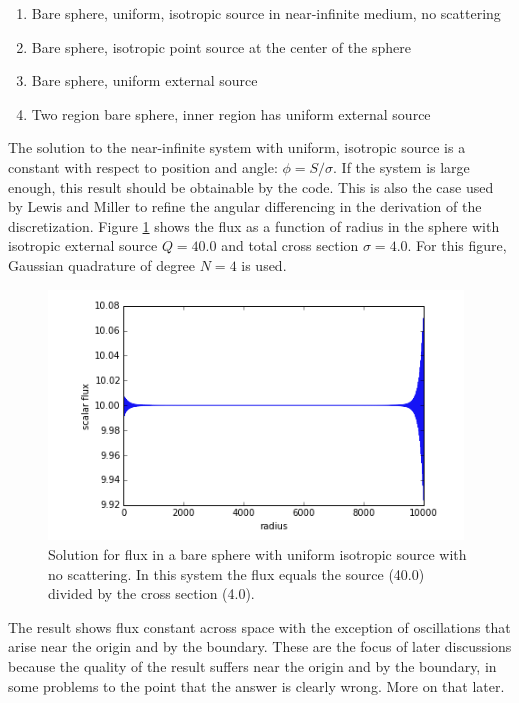 \documentclass[11pt, oneside]{article}   	%
\begin{document}
\begin{enumerate}
\item Bare sphere, uniform, isotropic source in near-infinite medium, no scattering
\item Bare sphere, isotropic point source at the center of the sphere
\item Bare sphere, uniform external source
\item Two region bare sphere, inner region has uniform external source 
\end{enumerate}

The solution to the near-infinite system with uniform, isotropic source is a constant with respect to position and angle: $\phi = S/\sigma$. If the system is large enough, this result should be obtainable by the code. This is also the case used by Lewis and Miller \cite{lm} to refine the angular differencing in the derivation of the discretization. Figure \ref{fig:near_inf_uniform} shows the flux as a function of radius in the sphere with isotropic external source $Q = 40.0$ and total cross section $\sigma = 4.0$. For this figure, Gaussian quadrature of degree $N=4$ is used.
%
\begin{figure}
\centering
\includegraphics[width=11cm]{uniform_src_near_inf}
\caption{Solution for flux in a bare sphere with uniform isotropic source with no scattering. In this system the flux equals the source (40.0) divided by the cross section (4.0).}
\label{fig:near_inf_uniform}
\end{figure}
%
The result shows flux constant across space with the exception of oscillations that arise near the origin and by the boundary. These are the focus of later discussions because the quality of the result suffers near the origin and by the boundary, in some problems to the point that the answer is clearly wrong. More on that later.
\end{document}
